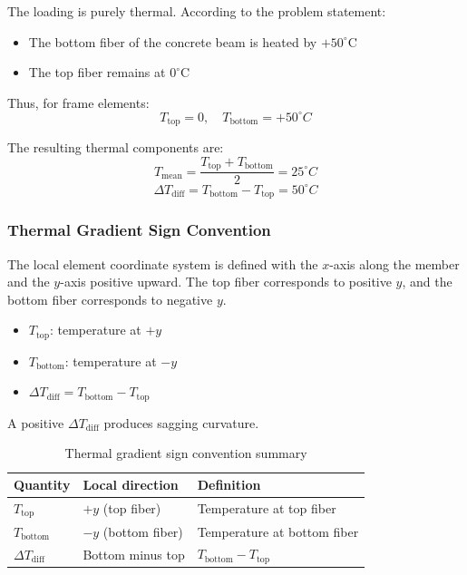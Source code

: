 The loading is purely thermal. According to the problem statement:

\begin{itemize}
    \item The bottom fiber of the concrete beam is heated by $+50^\circ$C
    \item The top fiber remains at $0^\circ$C
\end{itemize}

Thus, for frame elements:
\[
T_{\text{top}} = 0, \quad T_{\text{bottom}} = +50^\circ C
\]

The resulting thermal components are:
\[
T_{\text{mean}} = \frac{T_{\text{top}} + T_{\text{bottom}}}{2} = 25^\circ C
\]
\[
\Delta T_{\text{diff}} = T_{\text{bottom}} - T_{\text{top}} = 50^\circ C
\]

\subsubsection*{Thermal Gradient Sign Convention}

The local element coordinate system is defined with the $x$-axis along the member and the $y$-axis positive upward. The top fiber corresponds to positive $y$, and the bottom fiber corresponds to negative $y$.

\begin{itemize}
    \item $T_{\text{top}}$: temperature at $+y$
    \item $T_{\text{bottom}}$: temperature at $-y$
    \item $\Delta T_{\text{diff}} = T_{\text{bottom}} - T_{\text{top}}$
\end{itemize}

A positive $\Delta T_{\text{diff}}$ produces sagging curvature.

\begin{table}[H]
\centering
\caption{Thermal gradient sign convention summary}
\begin{tabular}{lll}
\toprule
Quantity & Local direction & Definition \\
\midrule
$T_{\text{top}}$ & $+y$ (top fiber) & Temperature at top fiber \\
$T_{\text{bottom}}$ & $-y$ (bottom fiber) & Temperature at bottom fiber \\
$\Delta T_{\text{diff}}$ & Bottom minus top & $T_{\text{bottom}} - T_{\text{top}}$ \\
\bottomrule
\end{tabular}
\end{table}


